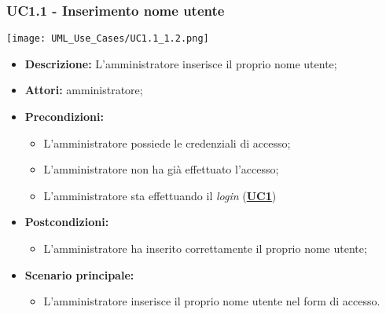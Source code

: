 \subsubsection{UC1.1 - Inserimento nome utente}
\label{sec:UC1.1}
\texttt{[image: UML\_Use\_Cases/UC1.1\_1.2.png]}
\begin{itemize}
	\item \textbf{Descrizione:} L’amministratore inserisce il proprio nome utente;
	\item \textbf{Attori:} amministratore;
	\item \textbf{Precondizioni:} 
	\begin{itemize}
		\item L’amministratore possiede le credenziali di accesso;
		\item L’amministratore non ha già effettuato l’accesso;
		\item L’amministratore sta effettuando il \textit{login} (\hyperref[sec:UC1]{\textbf{UC1}})
	\end{itemize}
	\item \textbf{Postcondizioni:} 
	\begin{itemize}
		\item L’amministratore ha inserito correttamente il proprio nome utente;
	\end{itemize}
	\item \textbf{Scenario principale:} 
	\begin{itemize}
		\item L’amministratore inserisce il proprio nome utente nel form di accesso.
	\end{itemize}
\end{itemize}

